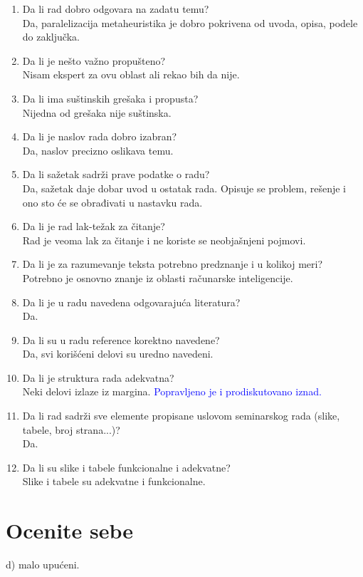\documentclass[a4paper]{report}
\newcommand{\odgovor}[1]{\textcolor{blue}{#1}}
\begin{document}
\begin{enumerate}
\item Da li rad dobro odgovara na zadatu temu?\\
    Da, paralelizacija metaheuristika je dobro pokrivena od uvoda, opisa, podele do zaključka.
\item Da li je nešto važno propušteno?\\
    Nisam ekspert za ovu oblast ali rekao bih da nije.
\item Da li ima suštinskih grešaka i propusta?\\
Nijedna od grešaka nije suštinska.
\item Da li je naslov rada dobro izabran?\\
Da, naslov precizno oslikava temu.
\item Da li sažetak sadrži prave podatke o radu?\\
Da, sažetak daje dobar uvod u ostatak rada. Opisuje se problem, rešenje i ono sto će se obrađivati u nastavku rada.
\item Da li je rad lak-težak za čitanje?\\
Rad je veoma lak za čitanje i ne koriste se neobjašnjeni pojmovi.
\item Da li je za razumevanje teksta potrebno predznanje i u kolikoj meri?\\
Potrebno je osnovno znanje iz oblasti računarske inteligencije.
\item Da li je u radu navedena odgovarajuća literatura?\\
Da.
\item Da li su u radu reference korektno navedene?\\
Da, svi korišćeni delovi su uredno navedeni.
\item Da li je struktura rada adekvatna?\\
Neki delovi izlaze iz margina. \odgovor{Popravljeno je i prodiskutovano iznad.}
\item Da li rad sadrži sve elemente propisane uslovom seminarskog rada (slike, tabele, broj strana...)?\\
Da.
\item Da li su slike i tabele funkcionalne i adekvatne?\\
Slike i tabele su adekvatne i funkcionalne.
\end{enumerate}

\section{Ocenite sebe}
d) malo upućeni.
\end{document}
